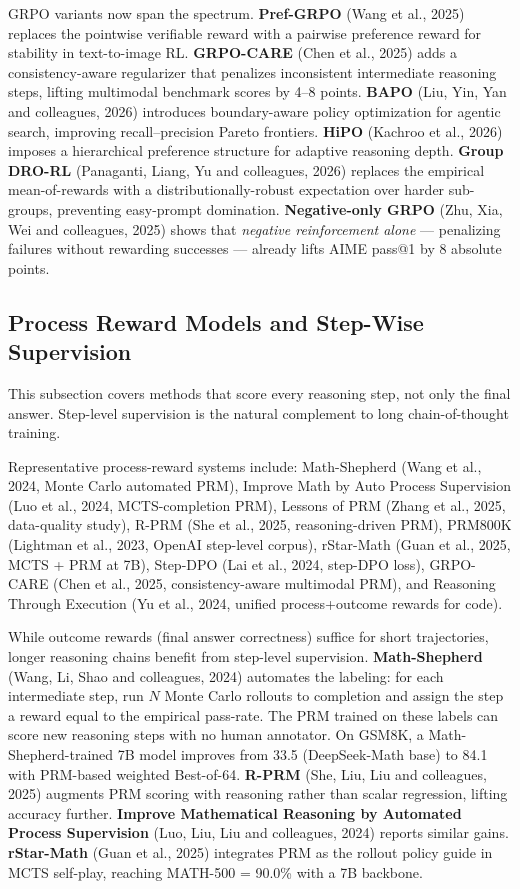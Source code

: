 GRPO variants now span the spectrum. \textbf{Pref-GRPO} (Wang et al., 2025) replaces the pointwise verifiable reward with a pairwise preference reward for stability in text-to-image RL. \textbf{GRPO-CARE} (Chen et al., 2025) adds a consistency-aware regularizer that penalizes inconsistent intermediate reasoning steps, lifting multimodal benchmark scores by 4--8 points. \textbf{BAPO} (Liu, Yin, Yan and colleagues, 2026) introduces boundary-aware policy optimization for agentic search, improving recall--precision Pareto frontiers. \textbf{HiPO} (Kachroo et al., 2026) imposes a hierarchical preference structure for adaptive reasoning depth. \textbf{Group DRO-RL} (Panaganti, Liang, Yu and colleagues, 2026) replaces the empirical mean-of-rewards with a distributionally-robust expectation over harder sub-groups, preventing easy-prompt domination. \textbf{Negative-only GRPO} (Zhu, Xia, Wei and colleagues, 2025) shows that \emph{negative reinforcement alone} --- penalizing failures without rewarding successes --- already lifts AIME pass@1 by 8 absolute points.

\subsection{Process Reward Models and Step-Wise Supervision}\label{process-reward-models-and-step-wise-supervision}

This subsection covers methods that score every reasoning step, not only the final answer. Step-level supervision is the natural complement to long chain-of-thought training.

Representative process-reward systems include: Math-Shepherd (Wang et al., 2024, Monte Carlo automated PRM), Improve Math by Auto Process Supervision (Luo et al., 2024, MCTS-completion PRM), Lessons of PRM (Zhang et al., 2025, data-quality study), R-PRM (She et al., 2025, reasoning-driven PRM), PRM800K (Lightman et al., 2023, OpenAI step-level corpus), rStar-Math (Guan et al., 2025, MCTS + PRM at 7B), Step-DPO (Lai et al., 2024, step-DPO loss), GRPO-CARE (Chen et al., 2025, consistency-aware multimodal PRM), and Reasoning Through Execution (Yu et al., 2024, unified process+outcome rewards for code).

While outcome rewards (final answer correctness) suffice for short trajectories, longer reasoning chains benefit from step-level supervision. \textbf{Math-Shepherd} (Wang, Li, Shao and colleagues, 2024) automates the labeling: for each intermediate step, run \(N\) Monte Carlo rollouts to completion and assign the step a reward equal to the empirical pass-rate. The PRM trained on these labels can score new reasoning steps with no human annotator. On GSM8K, a Math-Shepherd-trained 7B model improves from 33.5 (DeepSeek-Math base) to 84.1 with PRM-based weighted Best-of-64. \textbf{R-PRM} (She, Liu, Liu and colleagues, 2025) augments PRM scoring with reasoning rather than scalar regression, lifting accuracy further. \textbf{Improve Mathematical Reasoning by Automated Process Supervision} (Luo, Liu, Liu and colleagues, 2024) reports similar gains. \textbf{rStar-Math} (Guan et al., 2025) integrates PRM as the rollout policy guide in MCTS self-play, reaching MATH-500 = 90.0\% with a 7B backbone.

